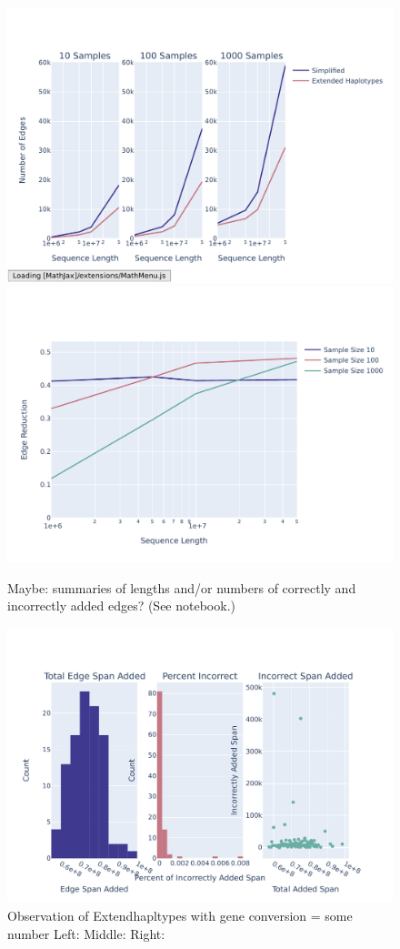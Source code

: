 \documentclass[10pt,twoside,lineno]{gsajnl}
\begin{document}
\begin{figure}
	\includegraphics[width=0.9\linewidth]{newplots_wo_ee/SL_vs_Num_edges_subplot.pdf}
	\includegraphics[width=0.9\linewidth]{newplots_wo_ee/edge_reduction_prop_vs_SL.pdf}
    \caption{
        Maybe: summaries of lengths and/or numbers of correctly and incorrectly added edges?
        (See notebook.)
        \label{fig:results_edges}
    }
\end{figure}

\begin{figure}
	\includegraphics[width=0.9\linewidth]{newplots_wo_ee/sampling_dist_geneconversion.pdf}
	\caption{Observation of Extendhapltypes with gene conversion = some number
	Left: 
	Middle:
	Right: }
\end{figure}
\end{document}
